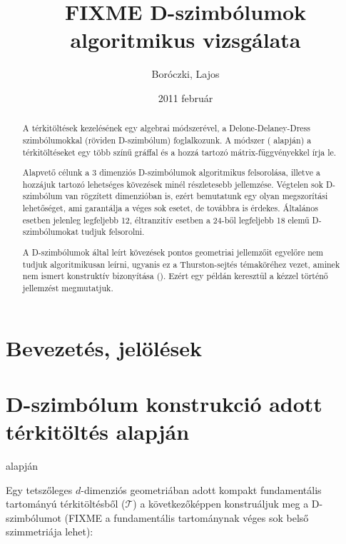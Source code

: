 \documentclass[12pt,magyar,a4paper]{article}
\begin{document}
\title{FIXME D-szimbólumok algoritmikus vizsgálata}
\author{Boróczki, Lajos}
\date{2011 február}
\maketitle

\begin{abstract}
  A térkitöltések kezelésének egy algebrai módszerével, a Delone-Delaney-Dress
  szimbólumokkal (röviden D-szimbólum) foglalkozunk. A módszer (\cite{xy}
  alapján) a térkitöltéseket egy több színű gráffal és a hozzá tartozó
  mátrix-függvényekkel írja le.

  Alapvető célunk a 3 dimenziós D-szimbólumok algoritmikus felsorolása, illetve
  a hozzájuk tartozó lehetséges kövezések minél részletesebb jellemzése.
  Végtelen sok D-szimbólum van rögzített dimenzióban is, ezért bemutatunk egy
  olyan megszorítási lehetőséget, ami garantálja a véges sok esetet, de
  továbbra is érdekes. Általános esetben jelenleg legfeljebb 12, éltranzitív
  esetben a 24-ből legfeljebb 18 elemű D-szimbólumokat tudjuk felsorolni.

  A D-szimbólumok által leírt kövezések pontos geometriai jellemzőit egyelőre
  nem tudjuk algoritmikusan leírni, ugyanis ez a Thurston-sejtés témaköréhez
  vezet, aminek nem ismert konstruktív bizonyítása (\cite{xy}). Ezért
  egy példán keresztül a kézzel történő jellemzést megmutatjuk.
\end{abstract}

\section{Bevezetés, jelölések}



\section{D-szimbólum konstrukció adott térkitöltés alapján}
\cite{xy} alapján

Egy tetszőleges $d$-dimenziós geometriában adott kompakt fundamentális
tartományú térkitöltésből ($\mathcal{T}$) a következőképpen konstruáljuk meg a
D-szimbólumot (FIXME a fundamentális tartománynak véges sok belső szimmetriája
lehet):
\end{document}
